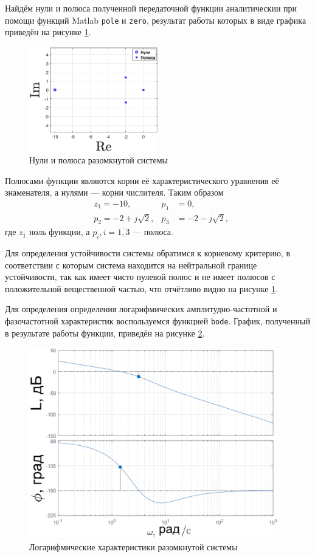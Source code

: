 \documentclass[fleqn, a4paper, 11pt, russian]{article}
\begin{document}
	Найдём нули и полюса полученной передаточной функции аналитическии при помощи функций Matlab \texttt{pole} и \texttt{zero}, результат работы которых в виде графика приведён на рисунке \ref{openpz}.
	\begin{figure}
		\centering
		\includegraphics[width = 0.5\textwidth]{Open/pz}
		\caption{Нули и полюса разомкнутой системы}
		\label{openpz}
	\end{figure}
	
	Полюсами функции являются корни её характеристического уравнения её знаменателя, а нулями --- корни числителя. Таким образом
	\begin{align}
		&z_1 = -10, &p_1 &= 0,\\
		&p_2 = -2 + j\sqrt{2}, &p_3 &= -2 - j\sqrt{2},
	\end{align}
	где $z_1$ ноль функции, а $p_i, i = \overline{1,3}$ --- полюса.
	
	Для определения устойчивости системы обратимся к корневому критерию, в соответствии с которым система находится на нейтральной границе устойчивости, так как имеет чисто нулевой полюс и не имеет полюсов с положительной вещественной частью, что отчётливо видно на рисунке \ref{openpz}.
	
	Для определения определения логарифмических амплитудно-частотной и фазочастотной характеристик воспользуемся функцией \texttt{bode}. График, полученный в результате работы функции, приведён на рисунке \ref{openbode}.
	\begin{figure}[ht!]
		\centering
		\includegraphics[height = 8.3cm]{Open/bode}
		\caption{Логарифмические характеристики разомкнутой системы}
		\label{openbode}
	\end{figure}
	
\end{document}

